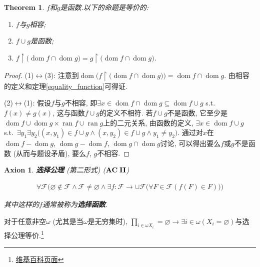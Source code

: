 \documentclass[openany]{ctexbook}
\makeatletter
\newcommand*{\indexbf}[1]{\emph{\textbf{#1}}\index{#1}} %
\newcommand*{\indexfm}[2]{#1\index{ 公式@笔记中出现的符号!#2@$#1$}} %
\theoremstyle{plain}
\newtheorem{axion}{Axion} %
\newtheorem{theorem}{Theorem}[section] %
\theoremstyle{definition}
\newcommand*{\properclass}[1]{\mathbf{#1}}
\DeclareMathOperator{\dom}{dom}
\DeclareMathOperator{\ran}{ran}
\makeatother
\begin{document}
\begin{theorem}\label{compatibility}
$f$和$g$是函数.以下的命题是等价的:
\begin{enumerate}[label=(\arabic*)]
\item $f$与$g$相容;
\item $f\cup g$是函数;
\item $f\upharpoonright \big(
	\dom f\cap \dom g\big) =
	g\upharpoonright \big(
	\dom f\cap \dom g\big)$.
\end{enumerate}

\end{theorem}
\begin{proof}
(1)$\leftrightarrow$(3): 注意到$\dom \Big(
	{f\upharpoonright \big(
		\dom f\cap \dom g\big)}\Big) = \dom f\cap \dom g$. 由相容的定义和定理\ref{equality_function}可得证.

(2)$\leftrightarrow$(1): 假设$f$与$g$不相容, 即$\exists x\in \dom f\cap \dom g\subseteq \dom{f\cup g}$ s.t.\ $f(x)\neq g(x)$, 这与函数$f\cup g$的定义不相符. 若$f\cup g$不是函数, 它至少是$\dom f\cup \dom g \times \ran f\cup \ran g$上的二元关系, 由函数的定义, $\exists x\in \dom{f\cup g}$ s.t.\ $\exists y_1\exists y_2\big(
	(x,y_1)\in f\cup g\wedge (x,y_2)\in f\cup g\wedge y_1\neq y_2\big)$. 通过对$x$在$\dom f - \dom g$, $\dom g - \dom f$, $\dom g\cap \dom g$讨论, 可以得出要么$f$或$g$不是函数 (从而与题设矛盾), 要么$f$, $g$不相容.
\end{proof}

\setcounter{axion}{8} %
\begin{axion}\label{AC2} \indexbf{选择公理} (第二形式) ($\indexfm{\properclass{AC\;II} }{AC2}$)

\begin{align*}
	\forall \mathcal F\Big(
		\varnothing \notin \mathcal F\wedge 
			\mathcal F\neq \varnothing \wedge
				\exists f\colon \mathcal F\to \cup \mathcal F \big(
					\forall F\in \mathcal F(
						f(F)\in F)\big)\Big)
\end{align*}

其中这样的$f$通常被称为\indexbf{选择函数}.
\end{axion}

对于任意非空$\omega$ (尤其是当$\omega$是无穷集时), $\prod_{i\in \omega X_i} = \varnothing \to \exists i\in \omega ( X_i = \varnothing)$与选择公理等价.\footnote{\href{https://zh.wikipedia.org/wiki/\%E7\%AC\%9B\%E5\%8D\%A1\%E5\%84\%BF\%E7\%A7\%AF\#\%E6\%97\%A0\%E7\%A9\%B7\%E4\%B9\%98\%E7\%A7\%AF
	}{维基百科页面}}
\end{document}
